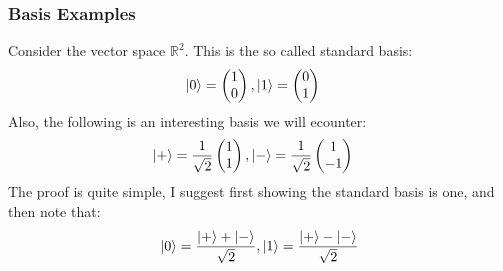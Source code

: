 \documentclass{beamer}
\begin{document}
    \begin{frame}
        \frametitle{Basis Examples}
        \begin{example}
            Consider the vector space $\mathbb{R}^2$. This is the so called standard basis:
            \begin{align}
                \ket{0} &= \begin{pmatrix}
                    1 \\
                    0
                \end{pmatrix}, \ket{1} = \begin{pmatrix}
                    0 \\
                    1
                \end{pmatrix}
            \end{align}
            Also, the following is an interesting basis we will ecounter:
            \begin{align}
                \ket{+} &= \frac{1}{\sqrt{2}} \begin{pmatrix}
                    1 \\
                    1
                \end{pmatrix}, \ket{-} = \frac{1}{\sqrt{2}} \begin{pmatrix}
                    1 \\
                    -1
                \end{pmatrix}
            \end{align}
            The proof is quite simple, I suggest first showing the standard basis is one, and then note that:
            \[ \ket{0} = \frac{\ket{+} + \ket{-}}{\sqrt{2}}, \ket{1} = \frac{\ket{+} - \ket{-}}{\sqrt{2}} \]
        \end{example}
    \end{frame}
\end{document}
